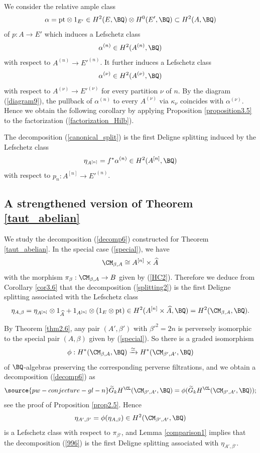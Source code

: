 We consider the relative ample class
\[
\alpha = \mathrm{pt} \otimes 1_{E'} \in H^2(E, \BQ)\otimes H^0(E', \BQ) \subset H^2(A, \BQ)
\]
of $p:A \to E'$ which induces a Lefschetz class
\[
\alpha^{(n)} \in H^2(A^{(n)}, \BQ)
\]
with respect to $A^{(n)} \to E'^{(n)}$. It further induces a Lefschetz class
\[
\alpha^{(\nu)} \in H^2(A^{(\nu)}, \BQ)
\]
with respect to $A^{(\nu)} \to E'^{(\nu)}$ for every partition $\nu$ of $n$. By the diagram (\ref{diagram9}), the pullback of $\alpha^{(n)}$ to every $A^{(\nu)}$ via $\kappa_\nu$ coincides with $\alpha^{(\nu)}$. Hence we obtain the following corollary by applying Proposition \ref{proposition3.5} to the factorization (\ref{factorization_Hilb}).

\begin{cor}
\notready\label{cor3.6}
The decomposition (\ref{canonical_split}) is the first Deligne splitting induced by the Lefschetz class
\[
\eta_{A^{[n]}} = f^*\alpha^{(n)} \in H^2(A^{[n]}, \BQ)
\]
with respect to $p_n: A^{[n]} \to E'^{(n)}$.
\end{cor}

\subsection{A strengthened version of Theorem \ref{taut_abelian}}\label{Section3.5}
We study the decomposition (\ref{decomp6}) constructed for Theorem \ref{taut_abelian}. In the special case (\ref{special}), we have
\[
\CM_{\beta, A} \cong A^{[n]} \times \widehat{A}
\]
with the morphism $\pi_\beta: \CM_{\beta,A} \to B$ given by (\ref{HC2}). Therefore we deduce from Corollary \ref{cor3.6} that the decomposition (\ref{splitting2}) is the first Deligne splitting associated with the Lefschetz class
\[
\eta_{A,\beta} = \eta_{A^{[n]}} \otimes 1_{\widehat{A}} + 1_{A^{[n]}}\otimes \left(1_E \otimes \mathrm{pt} \right) \in H^2(A^{[n]} \times \widehat{A}, \BQ) =  H^2(\CM_{\beta, A}, \BQ).
\]

By Theorem \ref{thm2.6}, any pair $(A', \beta')$ with $\beta'^2=2n$ is perversely isomorphic to the special pair $(A, \beta)$ given by (\ref{special}). So there is a graded isomorphism
\[
\phi: H^*(\CM_{\beta, A}, \BQ) \xrightarrow{\simeq} H^*(\CM_{\beta', A'}, \BQ)
\]
of $\BQ$-algebras preserving the corresponding perverse filtrations, and we obtain a decomposition (\ref{decomp6}) as
\begin{equation}\label{996}
\source{pw-conjecture-gl-n}
\widetilde{G}_kH^\CL(\CM_{\beta',A'}, \BQ) = \phi(\widetilde{G}_kH^\CL(\CM_{\beta',A'}, \BQ));
\end{equation}
see the proof of Proposition \ref{prop2.5}. Hence
\[
\eta_{A',\beta'} = \phi(\eta_{A,\beta}) \in H^2(\CM_{\beta',A'}, \BQ)
\]
is a Lefschetz class with respect to $\pi_{\beta'}$, and Lemma \ref{comparison1} implies that the decomposition (\ref{996}) is the first Deligne splitting associated with $\eta_{A',\beta'}$.


